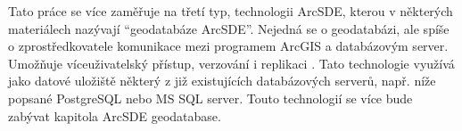        Tato práce se více zaměřuje na třetí typ, technologii ArcSDE, kterou v
        některých materiálech nazývají “geodatabáze ArcSDE”. Nejedná se o
        geodatabázi, ale spíše o zprostředkovatele komunikace mezi programem
        ArcGIS a databázovým server. Umožňuje víceuživatelský přístup,
        verzování i replikaci \citep{Esri2006}. Tato technologie využívá jako
        datové uložiště některý z již existujících databázových serverů, např.
        níže popsané PostgreSQL nebo MS SQL server. Touto technologií se více
        bude zabývat kapitola  ArcSDE geodatabase.
